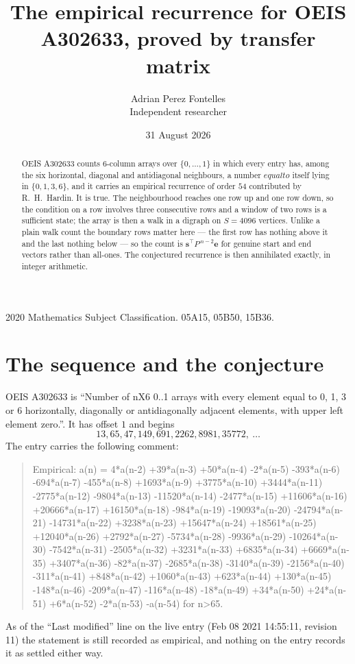 \documentclass[11pt,a4paper]{article}
\title{The empirical recurrence for OEIS A302633, proved by transfer matrix}
\author{Adrian Perez Fontelles\\ \small Independent researcher}
\date{31 August 2026}
\theoremstyle{plain}
\theoremstyle{definition}
\begin{document}
\maketitle

\begin{abstract}
OEIS A302633 counts $6$-column arrays over $\{0,\dots,1\}$ in which every entry has,
among the six horizontal, diagonal and antidiagonal neighbours, a number $equal to$ itself lying in $\{0,1,3,6\}$, and it carries an empirical
recurrence of order $54$ contributed by R.~H.~Hardin. It is true. The neighbourhood
reaches one row up and one row down, so the condition on a row involves three consecutive
rows and a window of two rows is a sufficient state; the array is then a walk in a digraph
on $S=4096$ vertices. Unlike a plain walk count the boundary rows matter here --- the first
row has nothing above it and the last nothing below --- so the count is
$\mathbf{s}^{\!\top}P^{\,n-2}\mathbf{e}$ for genuine start and end vectors rather than
all-ones. The conjectured recurrence is then annihilated exactly, in integer arithmetic.
\end{abstract}

\noindent\small 2020 Mathematics Subject Classification. 05A15, 05B50, 15B36.\normalsize

\section{The sequence and the conjecture}

OEIS A302633 is ``Number of nX6 0..1 arrays with every element equal to 0, 1, 3 or 6 horizontally, diagonally or antidiagonally adjacent elements, with upper left element zero.''. It has offset
$1$ and begins
\[
13, 65, 47, 149, 691, 2262, 8981, 35772,\ \dots
\]
The entry carries the following comment:
\begin{quote}\small
Empirical: a(n) = 4*a(n-2) +39*a(n-3) +50*a(n-4) -2*a(n-5) -393*a(n-6) -694*a(n-7) -455*a(n-8) +1693*a(n-9) +3775*a(n-10) +3444*a(n-11) -2775*a(n-12) -9804*a(n-13) -11520*a(n-14) -2477*a(n-15) +11606*a(n-16) +20666*a(n-17) +16150*a(n-18) -984*a(n-19) -19093*a(n-20) -24794*a(n-21) -14731*a(n-22) +3238*a(n-23) +15647*a(n-24) +18561*a(n-25) +12040*a(n-26) +2792*a(n-27) -5734*a(n-28) -9936*a(n-29) -10264*a(n-30) -7542*a(n-31) -2505*a(n-32) +3231*a(n-33) +6835*a(n-34) +6669*a(n-35) +3407*a(n-36) -82*a(n-37) -2685*a(n-38) -3140*a(n-39) -2156*a(n-40) -311*a(n-41) +848*a(n-42) +1060*a(n-43) +623*a(n-44) +130*a(n-45) -148*a(n-46) -209*a(n-47) -116*a(n-48) -18*a(n-49) +34*a(n-50) +24*a(n-51) +6*a(n-52) -2*a(n-53) -a(n-54) for n>65.
\end{quote}
As of the ``Last modified'' line on the live entry (Feb 08 2021 14:55:11, revision
11) the statement is still recorded as empirical, and nothing on the entry
records it as settled either way.
\end{document}
